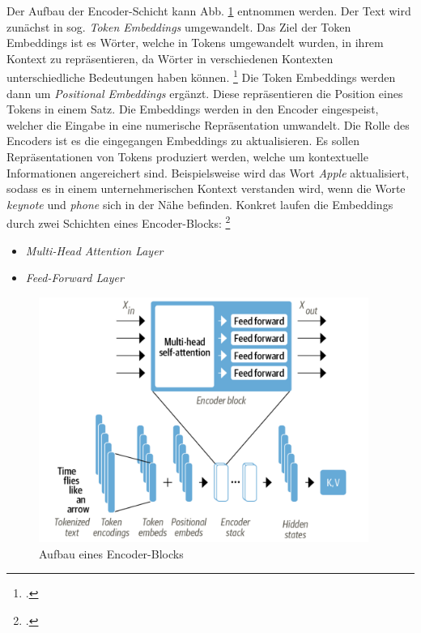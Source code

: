 Der Aufbau der Encoder-Schicht kann Abb. \ref{fig:encoder-block} entnommen werden. Der Text wird zunächst in sog. \emph{Token Embeddings} umgewandelt. Das Ziel der Token Embeddings ist es Wörter, welche in Tokens umgewandelt wurden, in ihrem Kontext zu repräsentieren, da Wörter in verschiedenen Kontexten unterschiedliche Bedeutungen haben können. \footcites[Vgl.][S.692]{popa_towards_2021} %
Die Token Embeddings werden dann um \emph{Positional Embeddings} ergänzt. Diese repräsentieren die Position eines Tokens in einem Satz. Die Embeddings werden in den Encoder eingespeist, welcher die Eingabe in eine numerische Repräsentation umwandelt. Die Rolle des Encoders ist es die eingegangen Embeddings zu aktualisieren. Es sollen Repräsentationen von Tokens produziert werden, welche um kontextuelle Informationen angereichert sind. Beispielsweise wird das Wort \emph{Apple} aktualisiert, sodass es in einem unternehmerischen Kontext verstanden wird, wenn die Worte \emph{keynote} und \emph{phone} sich in der Nähe befinden. Konkret laufen die Embeddings durch zwei Schichten eines Encoder-Blocks: \footcites[Vgl.][S.58 ff.]{tunstall_natural_2022}
\begin{itemize}
    \item \emph{Multi-Head Attention Layer}
    \item \emph{Feed-Forward Layer}
\end{itemize}

\begin{figure}[h]
    \centering
    \includegraphics[height=80mm]{graphics/encoder-block.png}
    \caption[Aufbau eines Encoder-Blocks]{Aufbau eines Encoder-Blocks \footnotemark}
    \label{fig:encoder-block}
\end{figure}

